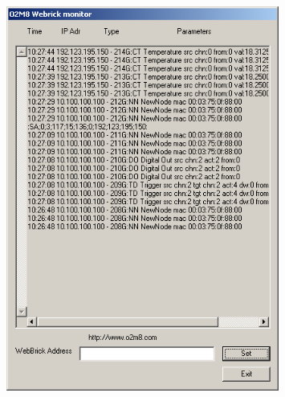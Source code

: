 \begin{figure}[H]
\centering
\includegraphics[width=0.8\textwidth]{Images/WebBrickMon2.png}
\end{figure}

